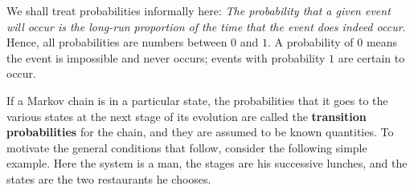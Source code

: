 We shall treat probabilities informally here: \textit{The probability that a given event will occur is the long-run proportion of the time that the event does indeed occur}. Hence, all probabilities are numbers between $0$ and $1$. A probability of $0$ means the event is impossible and never occurs; events with probability $1$ are certain to occur.


If a Markov chain is in a particular state, the probabilities that it goes to the various states at the next stage of its evolution are called the \textbf{transition probabilities} for the chain, and they are assumed to be known quantities. To motivate the general conditions that follow, consider the following simple example. Here the system is a man, the stages are his successive lunches, and the states are the two restaurants he chooses.

